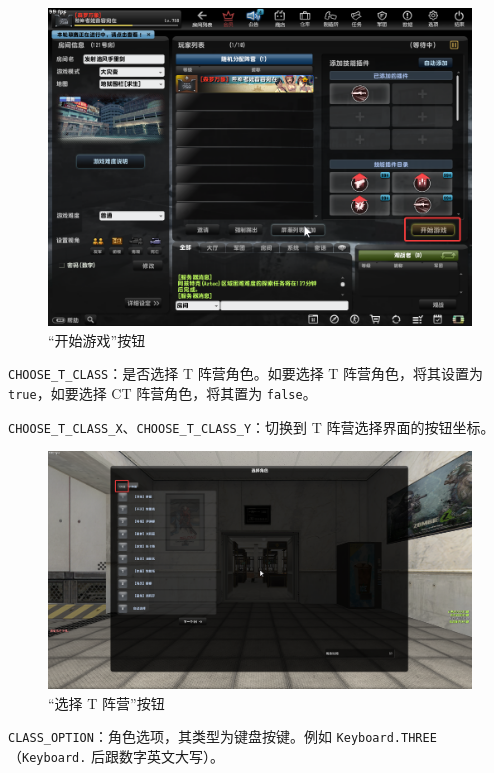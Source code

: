 \begin{figure}[H]
    \Centering
    \includegraphics[width=\textwidth]{docs/assets/start_game.png}
    \caption{“开始游戏”按钮}
\end{figure}

\lstinline{CHOOSE_T_CLASS}：是否选择 T 阵营角色。如要选择 T 阵营角色，将其设置为 \lstinline{true}，如要选择 CT 阵营角色，将其置为 \lstinline{false}。

\lstinline{CHOOSE_T_CLASS_X}、\lstinline{CHOOSE_T_CLASS_Y}：切换到 T 阵营选择界面的按钮坐标。

\begin{figure}[H]
    \Centering
    \includegraphics[width=\textwidth]{docs/assets/choose_T_class.png}
    \caption{“选择 T 阵营”按钮}
\end{figure}

\lstinline{CLASS_OPTION}：角色选项，其类型为键盘按键。例如 \lstinline{Keyboard.THREE}（\lstinline{Keyboard.} 后跟数字英文大写）。

